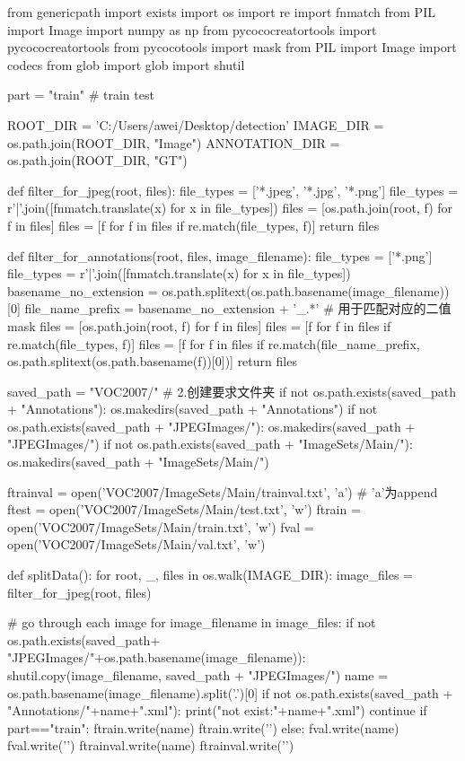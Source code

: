 \begin{python}
from genericpath import exists
import os
import re
import fnmatch
from PIL import Image
import numpy as np
from pycococreatortools import pycococreatortools
from pycocotools import mask
from PIL import Image
import codecs
from glob import glob
import shutil
 
part = "train"   # train  test

ROOT_DIR = 'C:/Users/awei/Desktop/detection'
IMAGE_DIR = os.path.join(ROOT_DIR, "Image")
ANNOTATION_DIR = os.path.join(ROOT_DIR, "GT")

def filter_for_jpeg(root, files):
    file_types = ['*.jpeg', '*.jpg', '*.png']
    file_types = r'|'.join([fnmatch.translate(x) for x in file_types])
    files = [os.path.join(root, f) for f in files]
    files = [f for f in files if re.match(file_types, f)]
    return files
 
def filter_for_annotations(root, files, image_filename):
    file_types = ['*.png']
    file_types = r'|'.join([fnmatch.translate(x) for x in file_types])
    basename_no_extension = os.path.splitext(os.path.basename(image_filename))[0]
    file_name_prefix = basename_no_extension + '_.*'   # 用于匹配对应的二值mask
    files = [os.path.join(root, f) for f in files]
    files = [f for f in files if re.match(file_types, f)]
    files = [f for f in files if re.match(file_name_prefix, os.path.splitext(os.path.basename(f))[0])]
    return files

saved_path = "VOC2007/"
# 2.创建要求文件夹
if not os.path.exists(saved_path + "Annotations"):
    os.makedirs(saved_path + "Annotations")
if not os.path.exists(saved_path + "JPEGImages/"):
    os.makedirs(saved_path + "JPEGImages/")
if not os.path.exists(saved_path + "ImageSets/Main/"):
    os.makedirs(saved_path + "ImageSets/Main/")

ftrainval = open('VOC2007/ImageSets/Main/trainval.txt', 'a')   # 'a'为append
ftest = open('VOC2007/ImageSets/Main/test.txt', 'w')  
ftrain = open('VOC2007/ImageSets/Main/train.txt', 'w')  
fval = open('VOC2007/ImageSets/Main/val.txt', 'w')

def splitData():
    for root, _, files in os.walk(IMAGE_DIR):
        image_files = filter_for_jpeg(root, files)

        # go through each image
        for image_filename in image_files:
            if not os.path.exists(saved_path+ "JPEGImages/"+os.path.basename(image_filename)):
                shutil.copy(image_filename, saved_path + "JPEGImages/")
            name = os.path.basename(image_filename).split('.')[0]
            if not os.path.exists(saved_path + "Annotations/"+name+".xml"):
                print("not exist:"+name+".xml")
                continue
            if part=="train":
                ftrain.write(name)
                ftrain.write('\n')
            else:
                fval.write(name)
                fval.write('\n')
            ftrainval.write(name)
            ftrainval.write('\n')


\end{python}
